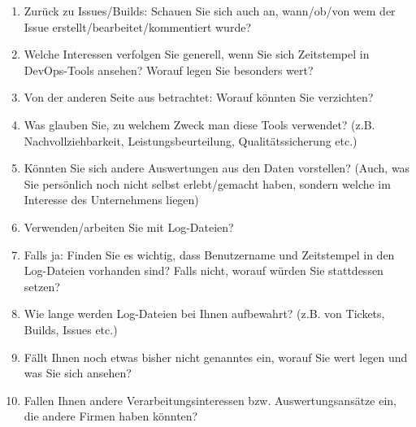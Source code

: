 \begin{enumerate}
    \item Zurück zu Issues/Builds: Schauen Sie sich auch an, wann/ob/von wem der Issue erstellt/bearbeitet/kommentiert wurde?
    \item Welche Interessen verfolgen Sie generell, wenn Sie sich Zeitstempel in DevOps-Tools ansehen? Worauf legen Sie besonders wert?
    \item Von der anderen Seite aus betrachtet: Worauf könnten Sie verzichten?
    \item Was glauben Sie, zu welchem Zweck man diese Tools verwendet? (z.B. Nachvollziehbarkeit, Leistungsbeurteilung, Qualitätssicherung etc.)
    \item Könnten Sie sich andere Auswertungen aus den Daten vorstellen? (Auch, was Sie persönlich noch nicht selbst erlebt/gemacht haben, sondern welche im Interesse des Unternehmens liegen)
    \item Verwenden/arbeiten Sie mit Log-Dateien?
    \item Falls ja: Finden Sie es wichtig, dass Benutzername und Zeitstempel in den Log-Dateien vorhanden sind? Falls nicht, worauf würden Sie stattdessen setzen?
    \item Wie lange werden Log-Dateien bei Ihnen aufbewahrt? (z.B. von Tickets, Builds, Issues etc.)
    \item Fällt Ihnen noch etwas bisher nicht genanntes ein, worauf Sie wert legen und was Sie sich ansehen?
    \item Fallen Ihnen andere Verarbeitungsinteressen bzw. Auswertungsansätze ein, die andere Firmen haben könnten?

\end{enumerate}